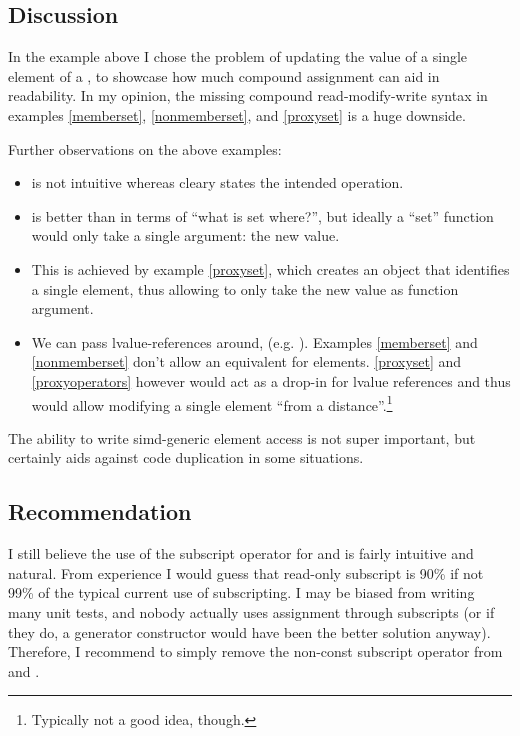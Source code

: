 \subsection{Discussion}
In the example above I chose the problem of updating the value of a single
element of a \simd, to showcase how much compound assignment can aid in
readability.
In my opinion, the missing compound read-modify-write syntax in examples
\ref{memberset}, \ref{nonmemberset}, and \ref{proxyset} is a huge downside.

Further observations on the above examples:
\begin{itemize}
  \item {} is not intuitive whereas  cleary
    states the intended operation.

  \item {} is better than  in terms of “what
    is set where?”, but ideally a “set” function would only take a single
    argument: the new value.

  \item This is achieved by example \ref{proxyset}, which creates an object
    that identifies a single element, thus allowing  to only take the
    new value as function argument.

  \item We can pass lvalue-references around, (e.g. ).
    Examples \ref{memberset} and \ref{nonmemberset} don't allow an equivalent
    for \simd elements.
    \ref{proxyset} and \ref{proxyoperators} however would act as a drop-in for
    lvalue references and thus would allow modifying a single \simd element
    “from a distance”.\footnote{Typically not a good idea, though.}
\end{itemize}

The ability to write simd-generic element access is not super important, but
certainly aids against code duplication in some situations.


\subsection{Recommendation}
I still believe the use of the subscript operator for \simd and \mask is fairly
intuitive and natural.
From experience I would guess that read-only subscript is 90\% if not 99\% of
the typical current use of subscripting.
I may be biased from writing many unit tests, and nobody actually uses
assignment through subscripts (or if they do, a generator constructor would
have been the better solution anyway).
Therefore, I recommend to simply remove the non-const subscript operator from
\simd and \mask.

